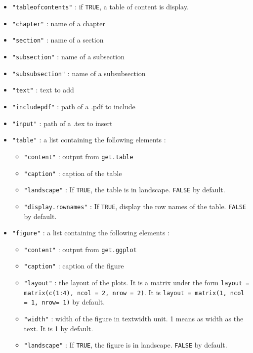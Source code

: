 \documentclass{article}\usepackage[]{graphicx}\usepackage[]{color}
\begin{document}
\begin{itemize}
\begin{itemize}
\item \texttt{"tableofcontents"} : if \texttt{TRUE}, a table of content is display.

\item \texttt{"chapter"} : name of a chapter

\item \texttt{"section"} : name of a section

\item \texttt{"subsection"} : name of a subsection

\item \texttt{"subsubsection"} : name of a subsubsection

\item \texttt{"text"} : text to add

\item \texttt{"includepdf"} : path of a .pdf to include

\item \texttt{"input"} : path of a .tex to insert

\item \texttt{"table"} : a list containing the following elements :
	\begin{itemize}
	\item \texttt{"content"} : output from \texttt{get.table}
	\item \texttt{"caption"} : caption of the table
	\item \texttt{"landscape"} : If \texttt{TRUE}, the table is in landscape. \texttt{FALSE} by default.
	\item \texttt{"display.rownames"} : If \texttt{TRUE}, display the row names of the table. \texttt{FALSE} by default.
	\end{itemize}

\item \texttt{"figure"} : a list containing the following elements :
	\begin{itemize}
	\item \texttt{"content"} : output from \texttt{get.ggplot}
	\item \texttt{"caption"} : caption of the figure
	\item \texttt{"layout"} : the layout of the plots. It is a matrix under the form \texttt{layout = matrix(c(1:4), ncol = 2, nrow = 2)}. It is \texttt{layout = matrix(1, ncol = 1, nrow= 1)} by default.
	\item \texttt{"width"} : width of the figure in textwidth unit. 1 means as width as the text. It is 1 by default.
	\item \texttt{"landscape"} : If \texttt{TRUE}, the figure is in landscape. \texttt{FALSE} by default.
	\end{itemize}


\end{itemize}
\end{itemize}
\end{document}

